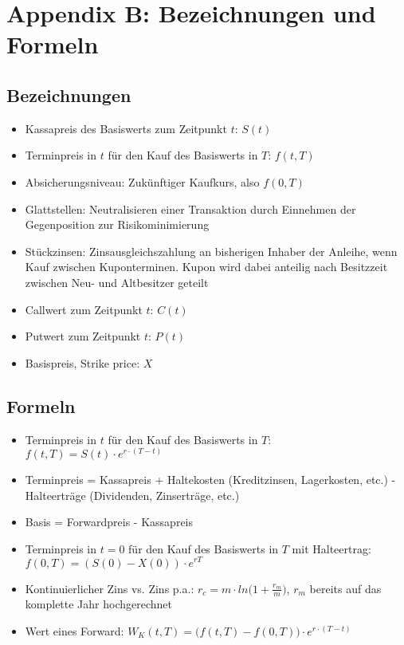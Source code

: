 \section{Appendix B: Bezeichnungen und Formeln}

\subsection{Bezeichnungen}
\begin{itemize}
	\item Kassapreis des Basiswerts zum Zeitpunkt \(t\): \(S(t)\)
	\item Terminpreis in \(t\) für den Kauf des Basiswerts in \(T\): \(f(t,T)\)
	\item Absicherungsniveau: Zukünftiger Kaufkurs, also \(f(0,T)\)
	\item Glattstellen: Neutralisieren einer Transaktion durch Einnehmen der Gegenposition zur Risikominimierung
	\item Stückzinsen: Zinsausgleichszahlung an bisherigen Inhaber der Anleihe, wenn Kauf zwischen Kuponterminen. Kupon wird dabei anteilig nach Besitzzeit zwischen Neu- und Altbesitzer geteilt
	\item Callwert zum Zeitpunkt \(t\): \(C(t)\)
	\item Putwert zum Zeitpunkt \(t\): \(P(t)\)
	\item Basispreis, Strike price: \(X\)
\end{itemize}


\subsection{Formeln}
\begin{itemize}
	\item Terminpreis in \(t\) für den Kauf des Basiswerts in \(T\): \(f(t,T) = S(t)\cdot e^{r\cdot (T-t)}\)
	\item Terminpreis = Kassapreis + Haltekosten (Kreditzinsen, Lagerkosten, etc.) - Halteerträge (Dividenden, Zinserträge, etc.)
	\item Basis = Forwardpreis - Kassapreis
	\item Terminpreis in \(t=0\) für den Kauf des Basiswerts in \(T\) mit Halteertrag: \(f(0,T) = (S(0)-X(0))\cdot e^{rT}\)
	\item Kontinuierlicher Zins vs. Zins p.a.: \(r_c = m \cdot ln\Big(1+\frac{r_m}{m}\Big)\), \(r_m\) bereits auf das komplette Jahr hochgerechnet
	\item Wert eines Forward: \(W_K(t,T) = \Big(f(t,T)-f(0,T)\Big) \cdot e^{r\cdot (T-t)}\)
\end{itemize}
